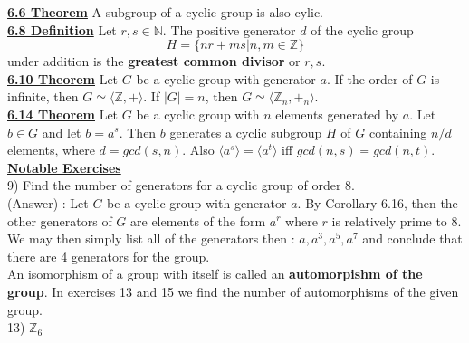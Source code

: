 \documentclass[12pt, letterpaper]{article}
\begin{document}
\noindent \underline{\bf 6.6 Theorem} A subgroup of a cyclic group is also cylic.\\

\noindent \underline{\bf 6.8 Definition} Let $r,s \in \mathbb{N}$. The positive generator $d$ of the cyclic group $$H = \{nr + ms | n,m \in \mathbb{Z} \}$$ under addition is the {\bf greatest common divisor} or $r,s$. \\

\noindent \underline{\bf 6.10 Theorem} Let $G$ be a cyclic group with generator $a$. If the order of $G$ is infinite, then $G \simeq \langle \mathbb{Z}, + \rangle$. If $|G| = n$, then $G \simeq \langle \mathbb{Z}_n, +_n \rangle$. \\

\noindent \underline{\bf 6.14 Theorem} Let $G$ be a cyclic group with $n$ elements generated by $a$. Let $b \in G$ and let $b = a^s$. Then $b$ generates a cyclic subgroup $H$ of $G$ containing $n/d$ elements, where $d = gcd(s,n)$. Also $\langle a^s \rangle = \langle a^t \rangle$ iff $gcd(n,s) = gcd(n,t)$.\\

\noindent \underline{\bf Notable Exercises}\\

9) Find the number of generators for a cyclic group of order 8. \\

(Answer) : Let $G$ be a cyclic group with generator $a$. By Corollary 6.16, then the other generators of $G$ are elements of the form $a^r$ where $r$ is relatively prime to 8. We may then simply list all of the generators then : $a,a^3,a^5,a^7$ and conclude that there are 4 generators for the group. \\

An isomorphism of a group with itself is called an {\bf automorpishm of the group}. In exercises 13 and 15 we find the number of automorphisms of the given group. \\

13) $\mathbb{Z}_6$ \\
\end{document}
